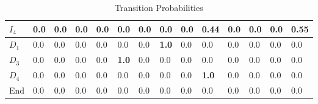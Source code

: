 \documentclass[12pt]{article}
\begin{document}
\begin{table}[H]
\begin{tabular}{|l|l|l|l|l|l|l|l|l|l|l|l|l|l|}
$I_4$    & 0.0   & 0.0           & 0.0           & 0.0          & 0.0           & 0.0           & 0.0           & 0.0           & \textbf{0.44} & 0.0           & 0.0           & 0.0           & \textbf{0.55} \\ \hline
$D_1$    & 0.0   & 0.0           & 0.0           & 0.0          & 0.0           & 0.0           & \textbf{1.0}  & 0.0           & 0.0           & 0.0           & 0.0           & 0.0           & 0.0           \\ \hline
$D_3$    & 0.0   & 0.0           & 0.0           & 0.0          & \textbf{1.0}  & 0.0           & 0.0           & 0.0           & 0.0           & 0.0           & 0.0           & 0.0           & 0.0           \\ \hline
$D_4$    & 0.0   & 0.0           & 0.0           & 0.0          & 0.0           & 0.0           & 0.0           & 0.0           & \textbf{1.0}  & 0.0           & 0.0           & 0.0           & 0.0           \\ \hline
End   & 0.0   & 0.0           & 0.0           & 0.0          & 0.0           & 0.0           & 0.0           & 0.0           & 0.0           & 0.0           & 0.0           & 0.0           & 0.0           \\ \hline
\end{tabular}
\caption{Transition Probabilities}
\end{table}
\newpage
\end{document}
